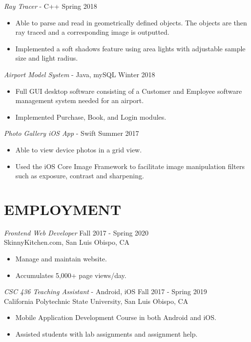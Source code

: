 \documentclass[margin]{res}
\begin{document}
\begin{resume}
                {\sl Ray Tracer} - C++ \hfill            Spring 2018
                 \begin{itemize}  \itemsep -2pt %
                 \item Able to parse and read in geometrically defined objects. The objects are then ray traced and a corresponding image is outputted.
                 \item Implemented a soft shadows feature using area lights with adjustable sample size and light radius.
                 \end{itemize}

                {\sl Airport Model System} - Java, mySQL \hfill        Winter 2018
                  \begin{itemize}
                   \item Full GUI desktop software consisting of a Customer and Employee software management system needed for an airport.
                   \item Implemented Purchase, Book, and Login modules.
                   \end{itemize}

                {\sl Photo Gallery iOS App} - Swift \hfill            Summer 2017
                 \begin{itemize}  \itemsep -2pt %
                 \item Able to view device photos in a grid view.
                 \item Used the iOS Core Image Framework to facilitate image manipulation filters such as exposure, contrast and sharpening.
                 \end{itemize}

\section{EMPLOYMENT} {\sl Frontend Web Developer} \hfill Fall 2017 - Spring 2020 \\
                SkinnyKitchen.com, San Luis Obispo, CA
                 \begin{itemize}  \itemsep -2pt %
                 \item Manage and maintain website.
                \item Accumulates 5,000+ page views/day.
                \end{itemize}

                {\sl CSC 436 Teaching Assistant} - Android, iOS \hfill Fall 2017 - Spring 2019 \\
                California Polytechnic State University, San Luis Obispo, CA
                 \begin{itemize}  \itemsep -2pt %
                 \item Mobile Application Development Course in both Android and iOS.
                 \item Assisted students with lab assignments and assignment help.
                \end{itemize}



\end{resume}
\end{document}
